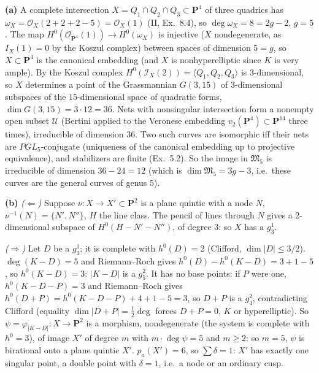 \documentclass[11pt]{article}
\begin{document}
\textbf{(a)} A complete intersection $X=Q_1\cap Q_2\cap Q_3\subset\mathbf P^4$ of three quadrics has $\omega_X=\mathcal O_X(2+2+2-5)=\mathcal O_X(1)$ (II, Ex.~8.4), so $\deg\omega_X=8=2g-2$, $g=5$. The map $H^0(\mathcal O_{\mathbf P^4}(1))\to H^0(\omega_X)$ is injective ($X$ nondegenerate, as $I_X(1)=0$ by the Koszul complex) between spaces of dimension $5=g$, so $X\subset\mathbf P^4$ is the canonical embedding (and $X$ is nonhyperelliptic since $K$ is very ample). By the Koszul complex $H^0(\mathcal I_X(2))=\langle Q_1,Q_2,Q_3\rangle$ is $3$-dimensional, so $X$ determines a point of the Grassmannian $G(3,15)$ of $3$-dimensional subspaces of the $15$-dimensional space of quadratic forms, $\dim G(3,15)=3\cdot12=36$. Nets with nonsingular intersection form a nonempty open subset $\mathcal U$ (Bertini applied to the Veronese embedding $v_2(\mathbf P^4)\subset\mathbf P^{14}$ three times), irreducible of dimension $36$. Two such curves are isomorphic iff their nets are $PGL_5$-conjugate (uniqueness of the canonical embedding up to projective equivalence), and stabilizers are finite (Ex.~5.2). So the image in $\mathfrak M_5$ is irreducible of dimension $36-24=12$ (which is $\dim\mathfrak M_5=3g-3$, i.e.\ these curves are the general curves of genus $5$).

\textbf{(b)} \emph{($\Leftarrow$)} Suppose $\nu:X\to X'\subset\mathbf P^2$ is a plane quintic with a node $N$, $\nu^{-1}(N)=\{N',N''\}$, $H$ the line class. The pencil of lines through $N$ gives a $2$-dimensional subspace of $H^0(H-N'-N'')$, of degree $3$: so $X$ has a $g^1_3$.

\emph{($\Rightarrow$)} Let $D$ be a $g^1_3$; it is complete with $h^0(D)=2$ (Clifford, $\dim|D|\le3/2$). $\deg(K-D)=5$ and Riemann--Roch gives $h^0(D)-h^0(K-D)=3+1-5$, so $h^0(K-D)=3$: $|K-D|$ is a $g^2_5$. It has no base points: if $P$ were one, $h^0(K-D-P)=3$ and Riemann--Roch gives $h^0(D+P)=h^0(K-D-P)+4+1-5=3$, so $D+P$ is a $g^2_4$, contradicting Clifford (equality $\dim|D+P|=\frac12\deg$ forces $D+P=0$, $K$ or hyperelliptic). So $\psi=\varphi_{|K-D|}:X\to\mathbf P^2$ is a morphism, nondegenerate (the system is complete with $h^0=3$), of image $X'$ of degree $m$ with $m\cdot\deg\psi=5$ and $m\ge2$: so $m=5$, $\psi$ is birational onto a plane quintic $X'$. $p_a(X')=6$, so $\sum\delta=1$: $X'$ has exactly one singular point, a double point with $\delta=1$, i.e.\ a node or an ordinary cusp.
\end{document}
